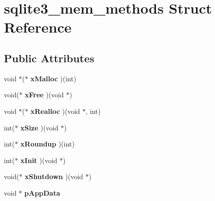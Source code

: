 \hypertarget{structsqlite3__mem__methods}{}\section{sqlite3\+\_\+mem\+\_\+methods Struct Reference}
\label{structsqlite3__mem__methods}
\subsection*{Public Attributes}
\begin{DoxyCompactItemize}
\item 
\mbox{\label{structsqlite3__mem__methods_acb9151cf501c851b61ab6b378832b159}} 
void $\ast$($\ast$ {\bfseries x\+Malloc} )(int)
\item 
\mbox{\label{structsqlite3__mem__methods_aa2e7fe8d030adaa17fd23a44fec1eca1}} 
void($\ast$ {\bfseries x\+Free} )(void $\ast$)
\item 
\mbox{\label{structsqlite3__mem__methods_a5bb7e62164d0934888473c618c61dc77}} 
void $\ast$($\ast$ {\bfseries x\+Realloc} )(void $\ast$, int)
\item 
\mbox{\label{structsqlite3__mem__methods_a6c68275b577d66ae659ef30344c8f86c}} 
int($\ast$ {\bfseries x\+Size} )(void $\ast$)
\item 
\mbox{\label{structsqlite3__mem__methods_a8b3f0d1ddeb498c4aaf9bbce5b92a268}} 
int($\ast$ {\bfseries x\+Roundup} )(int)
\item 
\mbox{\label{structsqlite3__mem__methods_ad0997b548928358d655000b6ac825cf4}} 
int($\ast$ {\bfseries x\+Init} )(void $\ast$)
\item 
\mbox{\label{structsqlite3__mem__methods_a6f48100692bd935d7f3dbb8c701ab6ca}} 
void($\ast$ {\bfseries x\+Shutdown} )(void $\ast$)
\item 
\mbox{\label{structsqlite3__mem__methods_af91b7adfa1f6aace0b129bac800bd444}} 
void $\ast$ {\bfseries p\+App\+Data}
\end{DoxyCompactItemize}


